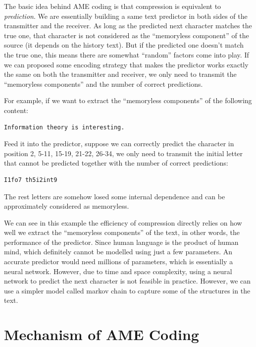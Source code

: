 \documentclass[12pt,twoside]{article}
\begin{document}
The basic idea behind AME coding is that compression is equivalent to \textit{prediction}. We are essentially building a same text predictor in both sides of the transmitter and the receiver. As long as the predicted next character matches the true one, that character is not considered as the ``memoryless component'' of the source (it depends on the history text). But if the predicted one doesn't match the true one, this means there are somewhat ``random'' factors come into play. If we can proposed some encoding strategy that makes the predictor works exactly the same on both the transmitter and receiver, we only need to transmit the ``memoryless components'' and the number of correct predictions. 

For example, if we want to extract the ``memoryless components'' of the following content:

\begin{lstlisting}[language=bash, style=custombash]
Information theory is interesting.
\end{lstlisting}

Feed it into the predictor, suppose we can correctly predict the character in position 2, 5-11, 15-19, 21-22, 26-34, we only need to transmit the initial letter that cannot be predicted together with the number of correct predictions:

\begin{lstlisting}[language=bash, style=custombash]
I1fo7 th5i2int9
\end{lstlisting}

The rest letters are somehow losed some internal dependence and can be approximately considered as memoryless. 

We can see in this example the efficiency of compression directly relies on how well we extract the ``memoryless components'' of the text, in other words, the performance of the predictor. Since human language is the product of human mind, which definitely cannot be modelled using just a few parameters. An accurate predictor would need millions of parameters, which is essentially a neural network. However, due to time and space complexity, using a neural network to predict the next character is not feasible in practice. However, we can use a simpler model called markov chain to capture some of the structures in the text.

\section{Mechanism of AME Coding}
\end{document}

